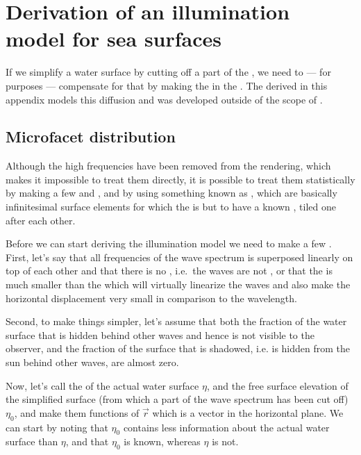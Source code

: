 \chapter{Derivation of an illumination model for sea surfaces}
\label{chap:illumination_model_derivation}

{
If we simplify a water surface by cutting off a part of the , we need to --- for \rendering purposes --- compensate for that by making the  in the  . The  derived in this appendix models this diffusion and was developed outside of the scope of \thismasterthesiswork.

\section{Microfacet distribution}

Although the high frequencies have been removed from the rendering, which makes it impossible to treat them directly, it is possible to treat them statistically by making a few \assumptions and \approximations, and by using something known as \microfacets, which are basically infinitesimal surface elements for which the  is \stochastic but \assumed to have a known , tiled one after each other.

Before we can start deriving the illumination model we need to make a few \assumptions. First, let's say that all frequencies of the wave spectrum is superposed linearly on top of each other and that there is no , i.e.\ the waves are not , or that the  is much smaller than the \wavelength which will virtually linearize the waves and also make the horizontal displacement very small in comparison to the wavelength.

Second, to make things simpler, let's assume that both the fraction of the water surface that is hidden behind other waves and hence is not visible to the observer, and the fraction of the surface that is shadowed, i.e. is hidden from the sun behind other waves, are almost zero.

Now, let's call the  of the actual water surface $\eta$, and the free surface elevation of the simplified surface (from which a part of the wave spectrum has been cut off) $\eta_0$, and make them functions of $\vec{r}$ which is a \twodimensional vector in the horizontal plane. We can start by noting that $\eta_0$ contains less information about the actual water surface than $\eta$, and that $\eta_0$ is known, whereas $\eta$ is not.

}
